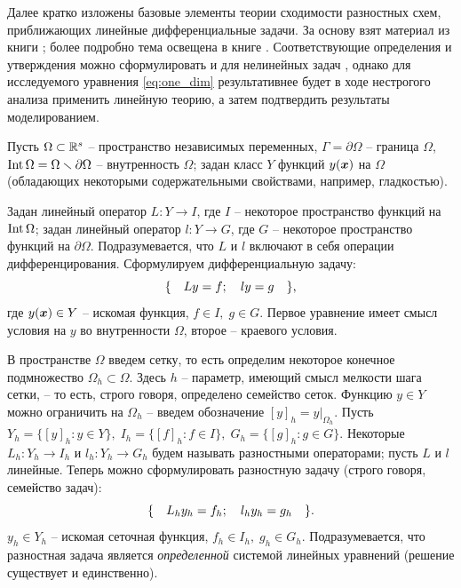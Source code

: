 Далее кратко изложены базовые элементы теории сходимости разностных схем, приближающих линейные дифференциальные задачи. За основу взят материал из книги \cite{bahvalov_computational_methods}; более подробно тема освещена в книге \cite{kalitkin_computational_methods}. Соответствующие определения и утверждения можно сформулировать и для нелинейных задач \cite{kalitkin_computational_methods}, однако для исследуемого уравнения \eqref{eq:one_dim} результативнее будет в ходе нестрогого анализа применить линейную теорию, а затем подтвердить результаты моделированием.

Пусть $\Omega \subset {\mathbb{R}}^s$ -- пространство независимых переменных, $\Gamma = \partial \Omega$ -- граница $\Omega$, $\operatorname{{Int}} \Omega = \Omega \smallsetminus \partial \Omega$ -- внутренность $\Omega$; задан класс $Y$ функций $y({\boldsymbol{x}})$ на $\Omega$ (обладающих некоторыми содержательными свойствами, например, гладкостью).

Задан линейный оператор $L: Y \to I$, где $I$ -- некоторое пространство функций на $\operatorname{{Int}} \Omega$; задан линейный оператор $l: Y \to G$, где $G$ -- некоторое пространство функций на $\partial \Omega$. Подразумевается, что $L$ и $l$ включают в себя операции дифференцирования. Сформулируем дифференциальную задачу:
\begin{equation}
    \{ \quad Ly = f; \quad ly = g \quad \} {\text{,}}
    \label{eq:formal_differential}
\end{equation}
где $y({\boldsymbol{x}}) \in Y$ -- искомая функция, $f \in I, \; g \in G$. Первое уравнение имеет смысл условия на $y$ во внутренности $\Omega$, второе -- краевого условия.

В пространстве $\Omega$ введем сетку, то есть определим некоторое конечное подмножество $\Omega_h \subset \Omega$. Здесь $h$ -- параметр, имеющий смысл мелкости шага сетки, -- то есть, строго говоря, определено семейство сеток. Функцию $y \in Y$ можно ограничить на $\Omega_h$ -- введем обозначение $[y]_h = y|_{\Omega_h}$. Пусть $Y_h = \{[y]_h: y \in Y\}, \; I_h = \{[f]_h: f \in I\}, \; G_h = \{[g]_h: g \in G\}$. Некоторые $L_h: Y_h \to I_h$ и $l_h: Y_h \to G_h$ будем называть разностными операторами; пусть $L$ и $l$ линейные. Теперь можно сформулировать разностную задачу (строго говоря, семейство задач):
\begin{equation}
    \{ \quad L_h y_h = f_h; \quad l_h y_h = g_h \quad \} {\text{.}}
    \label{eq:formal_subtractive}
\end{equation}
$y_h \in Y_h$ -- искомая сеточная функция, $f_h \in I_h, \; g_h \in G_h$. Подразумевается, что разностная задача является \emph{определенной} системой линейных уравнений (решение существует и единственно).

